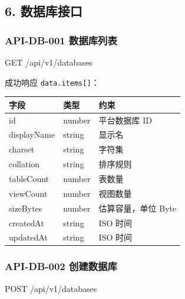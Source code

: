 \documentclass[
  a4paper,
  UTF8]{ctexart}
\newenvironment{Shaded}{}{}
\newcommand{\NormalTok}[1]{#1}
\begin{document}
\hypertarget{ux6570ux636eux5e93ux63a5ux53e3}{%
\subsection{6. 数据库接口}\label{ux6570ux636eux5e93ux63a5ux53e3}}

\hypertarget{api-db-001-ux6570ux636eux5e93ux5217ux8868}{%
\subsubsection{API-DB-001
数据库列表}\label{api-db-001-ux6570ux636eux5e93ux5217ux8868}}

\begin{Shaded}
\begin{Highlighting}[]
\NormalTok{GET /api/v1/databases}
\end{Highlighting}
\end{Shaded}

成功响应 \texttt{data.items{[}{]}}：

\begin{longtable}[]{@{}lll@{}}
\toprule
字段 & 类型 & 约束 \\
\midrule
\endhead
id & number & 平台数据库 ID \\
displayName & string & 显示名 \\
charset & string & 字符集 \\
collation & string & 排序规则 \\
tableCount & number & 表数量 \\
viewCount & number & 视图数量 \\
sizeBytes & number & 估算容量，单位 Byte \\
createdAt & string & ISO 时间 \\
updatedAt & string & ISO 时间 \\
\bottomrule
\end{longtable}

\hypertarget{api-db-002-ux521bux5efaux6570ux636eux5e93}{%
\subsubsection{API-DB-002
创建数据库}\label{api-db-002-ux521bux5efaux6570ux636eux5e93}}

\begin{Shaded}
\begin{Highlighting}[]
\NormalTok{POST /api/v1/databases}
\end{Highlighting}
\end{Shaded}
\end{document}
